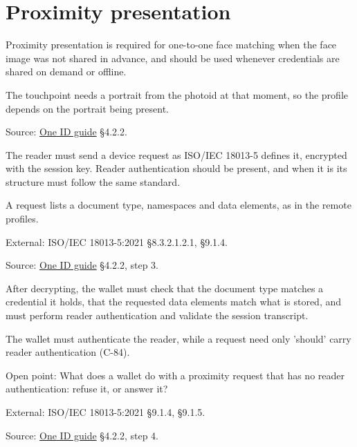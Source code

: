 
\section{Proximity presentation}

\begin{definition}
  \label{def:c80}
  Proximity presentation is required for one-to-one face matching when the
  face image was not shared in advance, and should be used whenever
  credentials are shared on demand or offline.

  The touchpoint needs a portrait from the photoid at that moment, so the
  profile depends on the portrait being present.

  Source:
  \href{https://standards.atlassian.net/wiki/spaces/OneID/pages/2947416082/Technical+Implementation+Guide}{One
  ID guide} §4.2.2.
\end{definition}

\begin{definition}
  \label{def:c84}
  The reader must send a device request as ISO/IEC 18013-5 defines it,
  encrypted with the session key. Reader authentication should be present,
  and when it is its structure must follow the same standard.

  A request lists a document type, namespaces and data elements, as in the
  remote profiles.

  External: ISO/IEC 18013-5:2021 §8.3.2.1.2.1, §9.1.4.

  Source:
  \href{https://standards.atlassian.net/wiki/spaces/OneID/pages/2947416082/Technical+Implementation+Guide}{One
  ID guide} §4.2.2, step 3.
\end{definition}

\begin{definition}
  \label{def:c85}
  \notready
  After decrypting, the wallet must check that the document type matches a
  credential it holds, that the requested data elements match what is stored,
  and must perform reader authentication and validate the session transcript.

  The wallet must authenticate the reader, while a request need only 'should'
  carry reader authentication (C-84).

  Open point: What does a wallet do with a proximity request that has no
  reader authentication: refuse it, or answer it?

  External: ISO/IEC 18013-5:2021 §9.1.4, §9.1.5.

  Source:
  \href{https://standards.atlassian.net/wiki/spaces/OneID/pages/2947416082/Technical+Implementation+Guide}{One
  ID guide} §4.2.2, step 4.
\end{definition}

